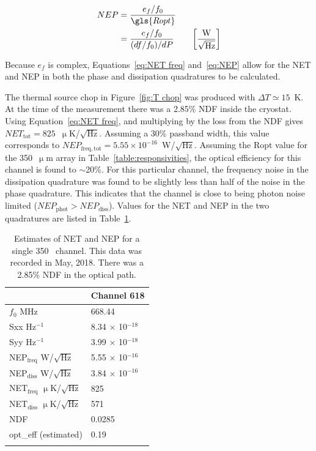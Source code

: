 \begin{equation}\label{eq:NEP}
  \begin{aligned}
  NEP &= \frac{e_{f}/f_{0}}{\gls{Ropt}} \\
      &=  \frac{e_{f}/f_{0}}{(df/f_{0})/dP} \qquad \left[ \frac{\mathrm{W}}{ \sqrt{\mathrm{Hz}} } \right]
  \end{aligned}
\end{equation}

Because $e_{f}$ is complex, Equations~\ref{eq:NET freq} and~\ref{eq:NEP} allow for the NET and NEP in both the phase and dissipation quadratures to be calculated.

The thermal source chop in Figure~\ref{fig:T chop} was produced with $\Delta T \simeq 15$~K. At the time of the measurement there was a 2.85\% NDF inside the cryostat. Using Equation~\ref{eq:NET freq}, and multiplying by the loss from the NDF gives $NET_{\mathrm{tot}} = 825$~$\upmu$K/$\sqrt{\mathrm{Hz}}$. Assuming a 30\% passband width, this value corresponds to $NEP_{\mathrm{freq,tot}} = 5.55 \times 10^{-16}$~W/$\sqrt{\mathrm{Hz}}$. Assuming the \gls{Ropt} value for the 350~$\upmu$m array in Table~\ref{table:responsivities}, the optical efficiency for this channel is found to $\sim$20\%. For this particular channel, the frequency noise in the dissipation quadrature was found to be slightly less than half of the noise in the phase quadrature. This indicates that the channel is close to being photon noise limited ($NEP_{\mathrm{phot}} > NEP_{\mathrm{diss}}$). Values for the NET and NEP in the two quadratures are listed in Table~\ref{table:NET NEP example}.


\begin{table}[!htbp]
\centering
\caption[~Single detector NET and NEP estimated from a thermal chop.]{Estimates of NET and NEP for a single 350~ channel. This data was recorded in May, 2018. There was a 2.85\% NDF in the optical path.}
\label{table:NET NEP example}
\begin{tabular}{@{}ll@{}}
\dtoprule{}
 & Channel 618 \\ \midrule
$f_{0}$ MHz & 668.44 \\
\gls{Sxx} Hz$^{-1}$ & 8.34 $\times$ 10$^{-18}$ \\
\gls{Syy} Hz$^{-1}$ & 3.99 $\times$ 10$^{-18}$ \\
NEP$_{\mathrm{freq}}$ W/$\sqrt{\mathrm{Hz}}$ & 5.55 $\times$ 10$^{-16}$ \\
NEP$_{\mathrm{diss}}$ W/$\sqrt{\mathrm{Hz}}$ & 3.84 $\times$ 10$^{-16}$ \\
NET$_{\mathrm{freq}}$ $\upmu$K/$\sqrt{\mathrm{Hz}}$ & 825 \\
NET$_{\mathrm{diss}}$ $\upmu$K/$\sqrt{\mathrm{Hz}}$ & 571 \\
NDF & 0.0285 \\
\gls{opt_eff} (estimated) & 0.19 \\ \dbottomrule{}
\\
\end{tabular}
\end{table}

